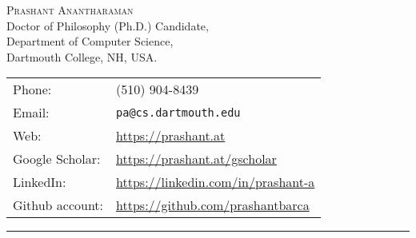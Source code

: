 \documentclass[letterpaper,10pt]{article}
\def\name{Prashant Anantharaman}
\begin{document}



\begin{minipage}{\linewidth}
  \centering
{\Large \textsc{\name}} \mbox{}\hfill \\
  Doctor of Philosophy (Ph.D.) Candidate,\\
  Department of Computer Science,\\
  Dartmouth College, NH, USA.\\
  \begin{tabular}{ll}
    Phone: & (510) 904-8439 \\
    Email: & \texttt{pa@cs.dartmouth.edu} \\
    Web: & \url{https://prashant.at} \\
    Google Scholar: & \url{https://prashant.at/gscholar}\\
    LinkedIn: & \url{https://linkedin.com/in/prashant-a}\\
    Github account: & \url{https://github.com/prashantbarca}
  \end{tabular}
\end{minipage}

\vspace{0.35cm}

\hrule



\end{document}
